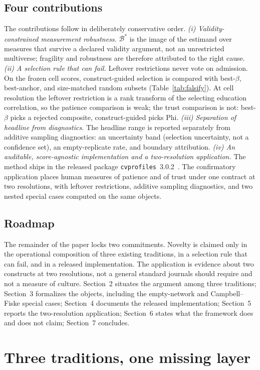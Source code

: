 \documentclass[10pt,letterpaper]{article}
\newcommand{\cvp}{\texttt{cvprofiles}}
\newcommand{\Bset}{\mathcal{B}}
\begin{document}
\subsection{Four contributions}
The contributions follow in deliberately conservative order.
\textit{(i) Validity-constrained measurement robustness.}
$\Bset^*$ is the image of the estimand over measures that survive a declared validity argument, not an unrestricted multiverse; fragility and robustness are therefore attributed to the right cause.
\textit{(ii) A selection rule that can fail.}
Leftover restrictions never vote on admission.
On the frozen cell scores, construct-guided selection is compared with best-$\beta$, best-anchor, and size-matched random subsets (Table~\ref{tab:falsify}).
At cell resolution the leftover restriction is a rank transform of the selecting education correlation, so the patience comparison is weak; the trust comparison is not: best-$\beta$ picks a rejected composite, construct-guided picks Phi.
\textit{(iii) Separation of headline from diagnostics.}
The headline range is reported separately from additive sampling diagnostics: an uncertainty band (selection uncertainty, not a confidence set), an empty-replicate rate, and boundary attribution.
\textit{(iv) An auditable, score-agnostic implementation and a two-resolution application.}
The method ships in the released package \cvp{}~3.0.2~\cite{cvprofiles}.
The confirmatory application places human measures of patience and of trust under one contract at two resolutions, with leftover restrictions, additive sampling diagnostics, and two nested special cases computed on the same objects.

\subsection{Roadmap}
The remainder of the paper locks two commitments.
Novelty is claimed only in the operational composition of three existing traditions, in a selection rule that can fail, and in a released implementation.
The application is evidence about two constructs at two resolutions, not a general standard journals should require and not a measure of culture.
Section~2 situates the argument among three traditions; Section~3 formalizes the objects, including the empty-network and Campbell--Fiske special cases; Section~4 documents the released implementation; Section~5 reports the two-resolution application; Section~6 states what the framework does and does not claim; Section~7 concludes.

\section{Three traditions, one missing layer}
\label{sec:traditions}
\end{document}
